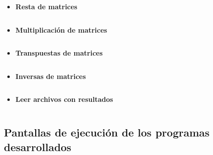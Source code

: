 \documentclass[12pt]{article}
\begin{document}
\begin{itemize}
\begin{itemize}
\begin{itemize}
                        \item \textbf{Resta de matrices}
                            \inputminted{c++}{Code/Windows/resta.c}

                        \item \textbf{Multiplicación de matrices}
                            \inputminted{c++}{Code/Windows/multiplicacion.c}  

                        \item \textbf{Transpuestas de matrices}
                            \inputminted{c++}{Code/Windows/transpuesta.c}

                        \item \textbf{Inversas de matrices}
                            \inputminted{c++}{Code/Windows/inversa.c}
                            
                        \item \textbf{Leer archivos con resultados}
                            \inputminted{c++}{Code/Windows/leerArchivos.c}

                    \end{itemize}
                              
                \end{itemize}
            
        \end{itemize}
        
        
        \newpage
        \subsection{Pantallas de ejecución de los programas desarrollados}

                        
\end{document}
